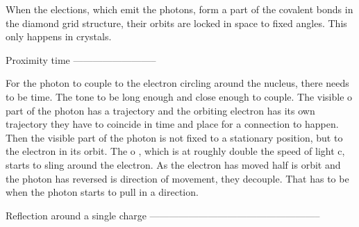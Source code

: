 When the elections, which emit the photons, form a part of the covalent bonds in the diamond grid structure, their orbits are locked in space to fixed angles. This only happens in crystals.

Proximity time
--------------------------

For the photon to couple to the electron circling around the nucleus, there needs to be time. The tone to be long enough and close enough to couple.
The visible o part of the photon has a trajectory and the orbiting electron has its own trajectory they have to coincide in time and place for a connection to happen.
Then the visible part of the photon is not fixed to a stationary position, but to the electron in its orbit. The o , which is at roughly double the speed of light c, starts to sling around the electron. As the electron has moved half is orbit and the photon has reversed is direction of movement, they decouple.
That has to be when the photon starts to pull in a direction.


Reflection around a single charge
-----------------------------------------------------





